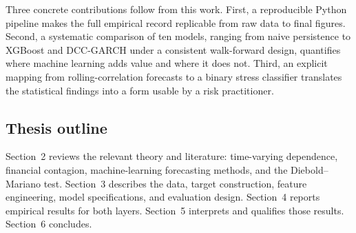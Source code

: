 Three concrete contributions follow from this work. First, a reproducible Python pipeline makes the full empirical record replicable from raw data to final figures. Second, a systematic comparison of ten models, ranging from naive persistence to XGBoost and DCC-GARCH under a consistent walk-forward design, quantifies where machine learning adds value and where it does not. Third, an explicit mapping from rolling-correlation forecasts to a binary stress classifier translates the statistical findings into a form usable by a risk practitioner.

\subsection{Thesis outline}

Section~2 reviews the relevant theory and literature: time-varying dependence, financial contagion, machine-learning forecasting methods, and the Diebold--Mariano test. Section~3 describes the data, target construction, feature engineering, model specifications, and evaluation design. Section~4 reports empirical results for both layers. Section~5 interprets and qualifies those results. Section~6 concludes.
